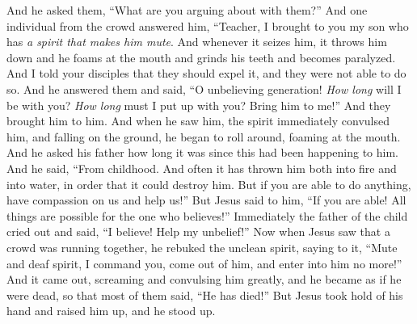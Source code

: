 \begin{biblechapter}
\verse And he asked them, “What are you arguing about with them?”
\verse And one individual from the crowd answered him, “Teacher, I brought to you my son who has \textit{a spirit that makes him mute}.
\verse And whenever it seizes him, it throws him down and he foams at the mouth and grinds his teeth and becomes paralyzed. And I told your disciples that they should expel it, and they were not able to do so.
\verse And he answered them and said, “O unbelieving generation! \textit{How long} will I be with you? \textit{How long} must I put up with you? Bring him to me!”
\verse And they brought him to him. And when he saw him, the spirit immediately convulsed him, and falling on the ground, he began to roll around, foaming at the mouth.
\verse And he asked his father how long it was since this had been happening to him. And he said, “From childhood.
\verse And often it has thrown him both into fire and into water, in order that it could destroy him. But if you are able to do anything, have compassion on us and help us!”
\verse But Jesus said to him, “If you are able! All things are possible for the one who believes!”
\verse Immediately the father of the child cried out and said, “I believe! Help my unbelief!”
\verse Now when Jesus saw that a crowd was running together, he rebuked the unclean spirit, saying to it, “Mute and deaf spirit, I command you, come out of him, and enter into him no more!”
\verse And it came out, screaming and convulsing him greatly, and he became as if he were dead, so that most of them said, “He has died!”
\verse But Jesus took hold of his hand and raised him up, and he stood up.

\end{biblechapter}
